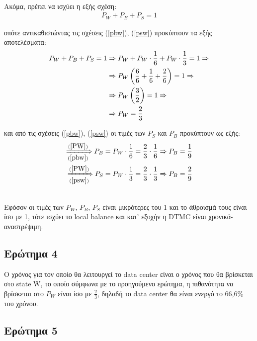 \noindent\\
Ακόμα, πρέπει να ισχύει η εξής σχέση:
\begin{align*}
	P_W + P_B + P_S = 1
\end{align*}

οπότε αντικαθιστώντας τις σχέσεις (\ref{pbw}), (\ref{psw}) προκύπτουν τα εξής αποτελέσματα:
\begin{align}
	P_W + P_B + P_S = 1 &\xRightarrow{} P_W + P_W \cdot \frac{1}{6} + P_W \cdot \frac{1}{3} = 1 \notag \xRightarrow{}\\
						&\xRightarrow{} P_W \left( \frac{6}{6} + \frac{1}{6} +  \frac{2}{6} \right) = 1 \notag \xRightarrow{}\\
						&\xRightarrow{} P_W \left( \frac{3}{2} \right) = 1 \notag \xRightarrow{}\\
						&\xRightarrow{} P_W = \frac{2}{3} \label{PW}
\end{align}

και από τις σχέσεις (\ref{pbw}), (\ref{psw}) οι τιμές των $P_S$ και $P_B$ προκύπτουν ως εξής:
\begin{align}
	\xRightarrow[(\ref{pbw})]{(\ref{PW})} P_B = P_W \cdot \frac{1}{6} = \frac{2}{3} \cdot \frac{1}{6} \xRightarrow{} P_B = \frac{1}{9}\\
	\xRightarrow[(\ref{psw})]{(\ref{PW})} P_S = P_W \cdot \frac{1}{3} = \frac{2}{3} \cdot \frac{1}{3} \xRightarrow{} P_B = \frac{2}{9}
\end{align}


\noindent\\
Εφόσον οι τιμές των $P_W$, $P_B$, $P_S$ είναι μικρότερες του 1 και το άθροισμά τους είναι ίσο με 1, τότε ισχύει το local balance και κατ' εξοχήν η DTMC είναι χρονικά-αναστρέψιμη.


\subsection*{Ερώτημα 4}
\label{ex2q4}

Ο χρόνος για τον οποίο θα λειτουργεί το data center είναι ο χρόνος που θα βρίσκεται στο state W, το οποίο σύμφωνα με το προηγούμενο ερώτημα, η πιθανότητα να βρίσκεται στο $P_W$ είναι ίσο με $\frac{2}{3}$, δηλαδή το data center θα είναι ενεργό το 66,6\% του χρόνου.


\subsection*{Ερώτημα 5}
\label{ex2q5}











